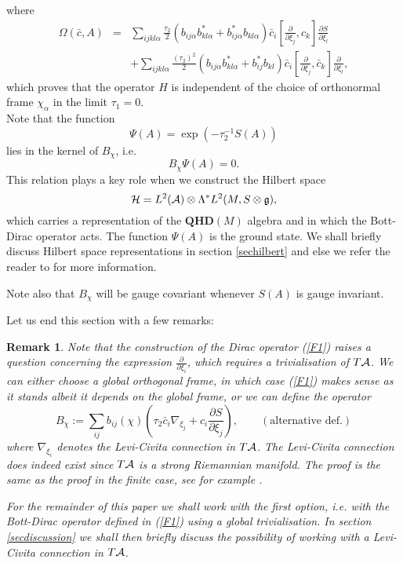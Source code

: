 \documentclass[letterpaper,11pt]{article}
\newcommand{\nn}{\nonumber}
\def\a{\alpha}
\def\OO{\Omega}
\def\ca{{\cal A}}
\def\ch{{\cal H}}
\newcommand{\pa}{\partial}
\newtheorem{remark}{Remark}
\begin{document}
where
\begin{eqnarray}
\OO(\bar{c}, A) &=&
 \sum_{ijkl\a} \frac{\tau_2}{2} \left(  b_{ij\a} b_{kl\a}^*+ b_{ij\a}^* b_{kl\a} \right) \bar{c}_i   \left[\frac{\pa}{\pa \xi_j }  , {c}_{k} \right]  \frac{\pa S}{\pa \xi_l }  
\nn\\&&
+ \sum_{ijkl\a} \frac{\left(\tau_2\right)^2}{2} \left(  b_{ij\a} b_{kl\a}^*+ b_{ij}^* b_{kl} \right) \bar{c}_i  \left[  \frac{\pa}{\pa \xi_j }  , \bar{c}_{k}\right]   \frac{\pa}{\pa \xi_l }     ,
\label{notzero}
\end{eqnarray}
which proves that the operator $H$ is independent of the choice of orthonormal frame $\chi_\a$ in the limit $\tau_1=0$.\\






Note that the function 
\begin{equation}
 \Psi(A) = \exp\left(- \tau_2^{-1} S(A)  \right) 
\label{groundstate}
\end{equation}
lies in the kernel of $B_\chi$, i.e.
$$
B_\chi \Psi(A)=0.
$$
This relation plays a key role when we construct the Hilbert space 
$$\ch=L^2(\ca)\otimes \Lambda^* L^2(M,S\otimes\mathfrak{g}),$$ which carries a representation of the $\mathbf{QHD}(M)$ algebra and in which the Bott-Dirac operator acts. The function $ \Psi(A)$ is the ground state. We shall briefly discuss Hilbert space representations in section \ref{sechilbert} and else we refer the reader to \cite{Aastrup:2019yui} for more information.

Note also that $B_\chi$ will be gauge covariant whenever $S(A)$ is gauge invariant.

Let us end this section with a few remarks:
\begin{remark}
Note that the construction of the Dirac operator (\ref{F1}) raises a question concerning
the expression $\frac{\pa}{\pa \xi_i}$, which requires a trivialisation of $T\ca$. We can either choose a global orthogonal frame, in which case (\ref{F1}) makes sense as it
stands albeit it depends on the global frame, or we can define 
the operator \cite{Aastrup:2019yui}
$$
B_\chi :=  \sum_{ij} b_{ij}(\chi)  \left(  \tau_2  \bar{c}_i     \nabla_{\xi_j}   +    {c}_{i} \frac{\pa S}{\pa \xi_j}\right),\qquad (\mbox{alternative def.})
$$
where $ \nabla_{\xi_i} $ denotes the Levi-Civita connection in $T\ca$. The Levi-Civita connection does indeed exist since $T\ca$ is a strong Riemannian manifold. The proof is the same as the proof in the finite case, see for example  \cite{michor}.

For the remainder of this paper we shall work with the first option, i.e. with the Bott-Dirac operator defined in (\ref{F1}) using a global trivialisation. In section \ref{secdiscussion} we shall then briefly discuss the possibility of working with a Levi-Civita connection in $T\ca$.
\end{remark}
\end{document}
